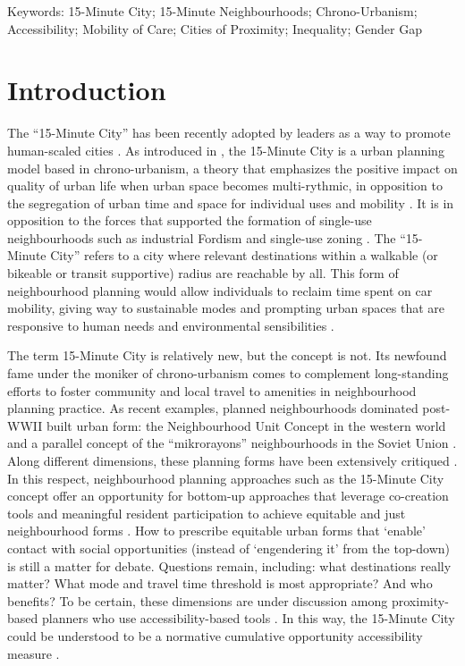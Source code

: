 \documentclass[
  authoryear,
  preprint,
  3p]{elsarticle}
\begin{document}
Keywords: 15-Minute City; 15-Minute Neighbourhoods; Chrono-Urbanism;
Accessibility; Mobility of Care; Cities of Proximity; Inequality; Gender
Gap

\section{Introduction}\label{introduction}

The ``15-Minute City'' has been recently adopted by leaders as a way to
promote human-scaled cities
\citep{teixeiraClassifying15minuteCities2024}. As introduced in
\citet{moreno_introducing_2021}, the 15-Minute City is a urban planning
model based in chrono-urbanism, a theory that emphasizes the positive
impact on quality of urban life when urban space becomes multi-rythmic,
in opposition to the segregation of urban time and space for individual
uses and mobility
\citep{mulicekUrbanRhythmsChronotopic2015, morenoVilleQuartHeure2016}.
It is in opposition to the forces that supported the formation of
single-use neighbourhoods such as industrial Fordism and single-use
zoning
\citep{mulicekUrbanRhythmsChronotopic2015, morenoVilleQuartHeure2016}.
The ``15-Minute City'' refers to a city where relevant destinations
within a walkable (or bikeable or transit supportive) radius are
reachable by all. This form of neighbourhood planning would allow
individuals to reclaim time spent on car mobility, giving way to
sustainable modes and prompting urban spaces that are responsive to
human needs and environmental sensibilities \citep{Allam2022}.

The term 15-Minute City is relatively new, but the concept is not. Its
newfound fame under the moniker of chrono-urbanism comes to complement
long-standing efforts to foster community and local travel to amenities
in neighbourhood planning practice. As recent examples, planned
neighbourhoods dominated post-WWII built urban form: the Neighbourhood
Unit Concept in the western world
\citep{brodyNeighbourhoodUnitConcept2013} and a parallel concept of the
``mikrorayons'' neighbourhoods in the Soviet Union
\citep{kissfazekasCircleParadigms15minute2022}. Along different
dimensions, these planning forms have been extensively critiqued
\citep{talenSocialSciencePlanned2017}. In this respect, neighbourhood
planning approaches such as the 15-Minute City concept offer an
opportunity for bottom-up approaches that leverage co-creation tools and
meaningful resident participation to achieve equitable and just
neighbourhood forms \citep{mahmoudCocreationPathwayUrban2021}. How to
prescribe equitable urban forms that `enable' contact with social
opportunities (instead of `engendering it' from the top-down) is still a
matter for debate. Questions remain, including: what destinations really
matter? What mode and travel time threshold is most appropriate? And who
benefits? To be certain, these dimensions are under discussion among
proximity-based planners who use accessibility-based tools
\citep{silvaProximitycentredAccessibilityConceptual2023, silvaRegionalAccessibilityUndermining2022, guzmanProximityEnoughCritical2024}.
In this way, the 15-Minute City could be understood to be a normative
cumulative opportunity accessibility measure
\citep{paez_measuring_2012}.
\end{document}
